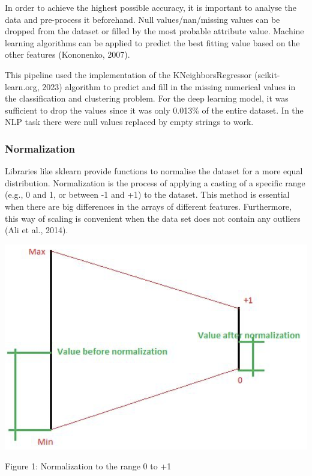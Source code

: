 \documentclass{article}
\begin{document}
\begin{multicols}{2}
In order to achieve the highest possible accuracy, it is important to analyse the data and pre-process it beforehand. Null values/nan/missing values can be dropped from the dataset or filled by the most probable attribute value. Machine learning algorithms can be applied to predict the best fitting value based on the other features (Kononenko, 2007).

This pipeline used the implementation of the KNeighborsRegressor (scikit-learn.org, 2023) algorithm to predict and fill in the missing numerical values in the classification and clustering problem. For the deep learning model, it was sufficient to drop the values since it was only 0.013\% of the entire dataset. In the NLP task there were null values replaced by empty strings to work.

\subsubsection{Normalization}

Libraries like sklearn provide functions to normalise the dataset for a more equal distribution. Normalization is the process of applying a casting of a specific range (e.g., 0 and 1, or between -1 and +1) to the dataset. This method is essential when there are big differences in the arrays of different features. Furthermore, this way of scaling is convenient when the data set does not contain any outliers (Ali et al., 2014).

\includegraphics[scale=.35]{img/norm1.png}

{\small
  Figure 1: Normalization to the range 0 to +1
  \par
  \vspace{6pt}
}



\end{multicols}
\end{document}
